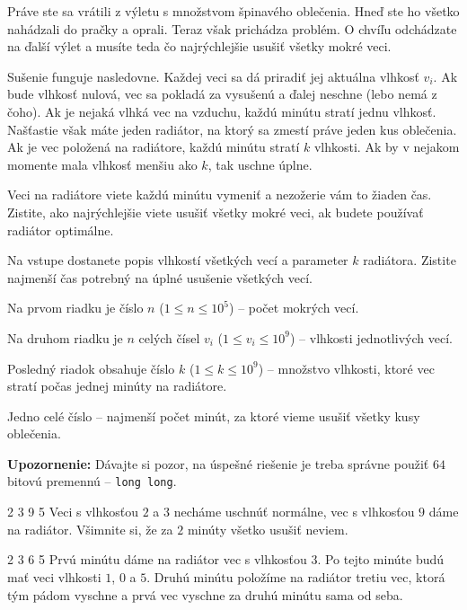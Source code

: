 




Práve ste sa vrátili z výletu s množstvom špinavého oblečenia. Hneď ste ho všetko nahádzali do
pračky a oprali. Teraz však prichádza problém. O chvíľu odchádzate na ďalší výlet a musíte teda čo
najrýchlejšie usušiť všetky mokré veci.

Sušenie funguje nasledovne. Každej veci sa dá priradiť jej aktuálna vlhkosť $v_i$. Ak bude vlhkosť
nulová, vec sa pokladá za vysušenú a ďalej neschne (lebo nemá z čoho). Ak je nejaká vlhká vec
na vzduchu, každú minútu stratí jednu vlhkosť. Našťastie však máte jeden radiátor, na ktorý sa
zmestí práve jeden kus oblečenia. Ak je vec položená na radiátore, každú minútu stratí $k$ vlhkosti.
Ak by v nejakom momente mala vlhkosť menšiu ako $k$, tak uschne úplne.

Veci na radiátore viete každú minútu vymeniť a nezožerie vám to žiaden čas. Zistite, ako
najrýchlejšie viete usušiť všetky mokré veci, ak budete používať radiátor optimálne.


Na vstupe dostanete popis vlhkostí všetkých vecí a parameter $k$ radiátora. Zistite najmenší čas
potrebný na úplné usušenie všetkých vecí.


Na prvom riadku je číslo $n$ ($1 \leq n \leq 10^5$) -- počet mokrých vecí.

Na druhom riadku je $n$ celých čísel $v_i$ ($1 \leq v_i \leq 10^9$) -- vlhkosti jednotlivých vecí.

Posledný riadok obsahuje číslo $k$ ($1 \leq k \leq 10^9$) -- množstvo vlhkosti, ktoré vec stratí
počas jednej minúty na radiátore.


Jedno celé číslo -- najmenší počet minút, za ktoré vieme usušiť všetky kusy oblečenia.

\medskip

\textbf{Upozornenie:} Dávajte si pozor, na úspešné riešenie je treba správne použiť $64$ bitovú
premennú -- \texttt{long long}.


2 3 9
5
\komentar
Veci s vlhkosťou $2$ a $3$ necháme uschnúť normálne, vec s vlhkosťou $9$ dáme na radiátor. Všimnite
si, že za $2$ minúty všetko usušiť neviem.
\koniec

2 3 6
5
\komentar
Prvú minútu dáme na radiátor vec s vlhkosťou $3$. Po tejto minúte budú mať veci vlhkosti $1$, $0$ a
$5$. Druhú minútu položíme na radiátor tretiu vec, ktorá tým pádom vyschne a prvá vec vyschne za
druhú minútu sama od seba.
\koniec


